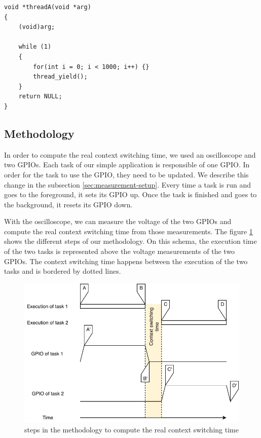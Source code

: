 \begin{lstlisting}[style=CStyle, float, label={lst:simple-task-code-riot}, caption={source code of a task implemented in RIOT for the simple application}]
void *threadA(void *arg)
{
    (void)arg;

    while (1)
    {
        for(int i = 0; i < 1000; i++) {}
        thread_yield();
    }
    return NULL;
}
\end{lstlisting}


\subsection{Methodology}

In order to compute the real context switching time, we used an oscilloscope and two GPIOs.
Each task of our simple application is responsible of one GPIO.
In order for the task to use the GPIO, they need to be updated.
We describe this change in the subsection \ref{sec:measurement-setup}.
Every time a task is run and goes to the foreground, it sets its GPIO up.
Once the task is finished and goes to the background, it resets its GPIO down.

With the oscilloscope, we can measure the voltage of the two GPIOs and compute the real context switching time from those measurements.
The figure \ref{fig:real-context-switching-time-measurement} shows the different steps of our methodology.
On this schema, the execution time of the two tasks is represented above the voltage measurements of the two GPIOs.
The context switching time happens between the execution of the two tasks and is bordered by dotted lines.

\begin{figure}[!ht]
  \centering
  \includegraphics[scale=1]{assets/real-context-switching-time-measurement.pdf}
  \caption{\label{fig:real-context-switching-time-measurement}steps in the methodology to compute the real context switching time}
\end{figure}

